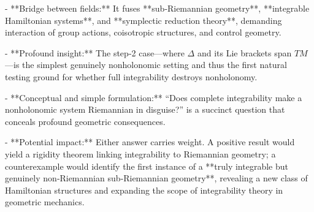 - **Bridge between fields:** It fuses **sub‑Riemannian geometry**, **integrable Hamiltonian systems**, and **symplectic reduction theory**, demanding interaction of group actions, coisotropic structures, and control geometry.  

- **Profound insight:** The step‑2 case—where \(\Delta\) and its Lie brackets span \(TM\)—is the simplest genuinely nonholonomic setting and thus the first natural testing ground for whether full integrability destroys nonholonomy.  

- **Conceptual and simple formulation:** “Does complete integrability make a nonholonomic system Riemannian in disguise?” is a succinct question that conceals profound geometric consequences.  

- **Potential impact:** Either answer carries weight. A positive result would yield a rigidity theorem linking integrability to Riemannian geometry; a counterexample would identify the first instance of a **truly integrable but genuinely non‑Riemannian sub‑Riemannian geometry**, revealing a new class of Hamiltonian structures and expanding the scope of integrability theory in geometric mechanics.